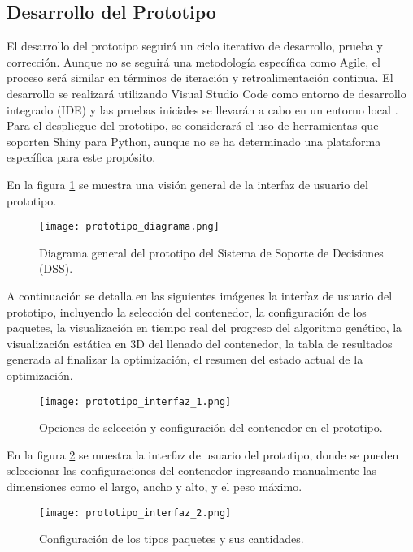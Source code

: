 \documentclass[9pt,a4paper]{rho}
\begin{document}
\subsection{Desarrollo del Prototipo}
El desarrollo del prototipo seguirá un ciclo iterativo de desarrollo, prueba y corrección. Aunque no se seguirá una metodología específica como Agile, el proceso será similar en términos de iteración y retroalimentación continua. El desarrollo se realizará utilizando Visual Studio Code como entorno de desarrollo integrado (IDE) y las pruebas iniciales se llevarán a cabo en un entorno local \cite{vscode-intro}. Para el despliegue del prototipo, se considerará el uso de herramientas que soporten Shiny para Python, aunque no se ha determinado una plataforma específica para este propósito.

En la figura \ref{fig:prototipo_diagrama} se muestra una visión general de la interfaz de usuario del prototipo.

\begin{figure}[h!]
    \centering
    \texttt{[image: prototipo\_diagrama.png]}
    \caption{Diagrama general del prototipo del Sistema de Soporte de Decisiones (DSS).}
    \label{fig:prototipo_diagrama}
\end{figure}

A continuación se detalla en las siguientes imágenes la interfaz de usuario del prototipo, incluyendo la selección del contenedor, la configuración de los paquetes, la visualización en tiempo real del progreso del algoritmo genético, la visualización estática en 3D del llenado del contenedor, la tabla de resultados generada al finalizar la optimización, el resumen del estado actual de la optimización.

\begin{figure}[h!]
    \centering
    \texttt{[image: prototipo\_interfaz\_1.png]}
    \caption{Opciones de selección y configuración del contenedor en el prototipo.}
    \label{fig:prototipo_interfaz_1}
\end{figure}

En la figura \ref{fig:prototipo_interfaz_1} se muestra la interfaz de usuario del prototipo, donde se pueden seleccionar las configuraciones del contenedor ingresando manualmente las dimensiones como el largo, ancho y alto, y el peso máximo.

\begin{figure}[h!]
    \centering
    \texttt{[image: prototipo\_interfaz\_2.png]}
    \caption{Configuración de los tipos paquetes y sus cantidades.}
    \label{fig:prototipo_interfaz_2}
\end{figure}
\end{document}
